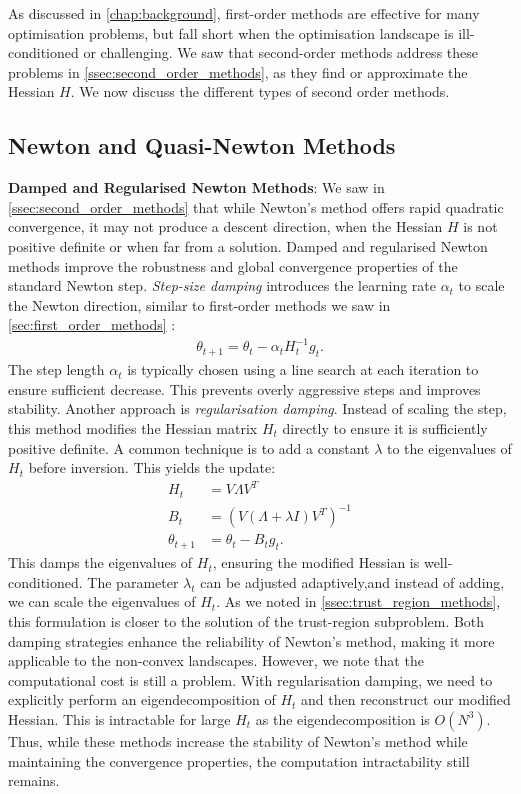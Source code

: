 As discussed in \cref{chap:background}, first-order methods are effective for many optimisation problems, but fall short when the optimisation landscape is ill-conditioned or challenging. We saw that second-order methods address these problems in \cref{ssec:second_order_methods}, as they find or approximate the Hessian $H$. We now discuss the different types of second order methods. 

\subsection{Newton and Quasi-Newton Methods} 
\label{sec:newton_methods}

\textbf{Damped and Regularised Newton Methods}:
We saw in \cref{ssec:second_order_methods} that while Newton's method offers rapid quadratic convergence, it may not produce a descent direction, when the Hessian $H$ is not positive definite or when far from a solution. Damped and regularised Newton methods improve the robustness and global convergence properties of the standard Newton step. \textit{Step-size damping} introduces the learning rate $\alpha_t$ to scale the Newton direction, similar to first-order methods we saw in \cref{sec:first_order_methods} \citep{sun2019survey}:
\begin{align}
    \theta_{t+1} = \theta_t - \alpha_t H_t^{-1} g_t.
\end{align}
The step length $\alpha_t$ is typically chosen using a line search at each iteration to ensure sufficient decrease. This prevents overly aggressive steps and improves stability. Another approach is \textit{regularisation damping}. Instead of scaling the step, this method modifies the Hessian matrix $H_t$ directly to ensure it is sufficiently positive definite. A common technique is to add a constant $\lambda$ to the eigenvalues of $H_t$ before inversion. This yields the update:
\begin{align}
    H_t &= V \Lambda V^T \\
    B_t &= (V (\Lambda + \lambda I) V^T)^{-1} \\
    \theta_{t+1} &= \theta_t - B_t g_t.
\end{align}
This damps the eigenvalues of $H_t$, ensuring the modified Hessian is well-conditioned. The parameter $\lambda_t$ can be adjusted adaptively,and instead of adding, we can scale the eigenvalues of $H_t$. As we noted in \cref{ssec:trust_region_methods}, this formulation is closer to the solution of the trust-region subproblem. Both damping strategies enhance the reliability of Newton's method, making it more applicable to the non-convex landscapes. However, we note that the computational cost is still a problem. With regularisation damping, we need to explicitly perform an eigendecomposition of $H_t$ and then reconstruct our modified Hessian. This is intractable for large $H_t$ as the eigendecomposition is $O(N^3)$. Thus, while these methods increase the stability of Newton's method while maintaining the convergence properties, the computation intractability still remains.

